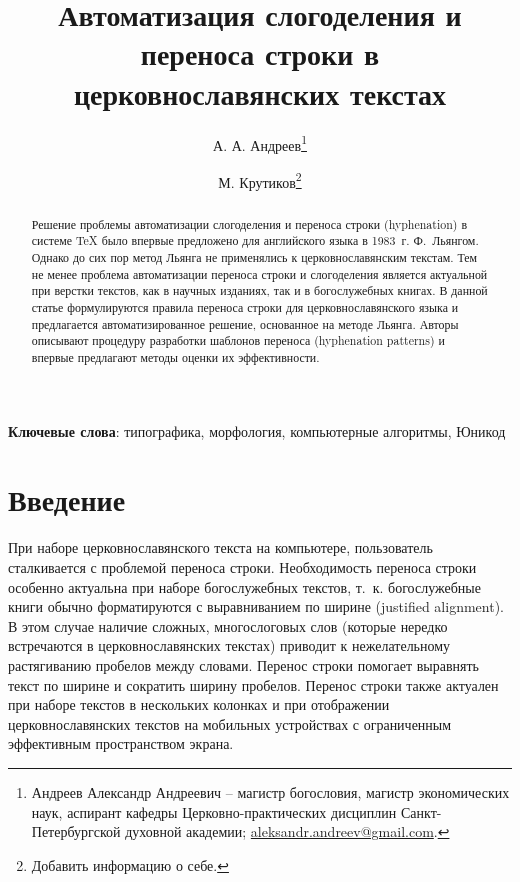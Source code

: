 \documentclass[12pt,a4paper,oneside]{extarticle}
\title{Автоматизация слогоделения и переноса строки в церковнославянских текстах}
\author{А. А. Андреев\thanks{Андреев Александр Андреевич -- магистр богословия, магистр экономических наук, аспирант кафедры Церковно-практических дисциплин Санкт-Петербургской духовной академии; \url{aleksandr.andreev@gmail.com}.} \and М. Крутиков\thanks{Добавить информацию о себе.}}
\date{\vspace{-1em}}  %
\providecommand{\keywords}[1]{\textbf{Ключевые слова}: #1}
\begin{document}
\maketitle

\begin{abstract}
Решение проблемы автоматизации слогоделения и переноса строки
(\textenglish{hyphenation}) в системе \TeX{} было впервые предложено для английского языка в 1983~г.
Ф.~Льянгом. Однако до сих пор метод Льянга не применялись к
церковнославянским текстам. Тем не менее проблема
автоматизации переноса строки и слогоделения является актуальной при
верстки текстов, как в научных изданиях, так и в богослужебных книгах. В данной статье
формулируются правила переноса строки для церковнославянского языка и
предлагается автоматизированное решение, основанное на методе Льянга.
Авторы описывают процедуру разработки шаблонов переноса (\textenglish{hyphenation patterns})
и впервые предлагают методы оценки их эффективности.
\end{abstract}

\keywords{типографика, морфология, компьютерные алгоритмы, Юникод}

\section{Введение}

При наборе церковнославянского текста на компьютере, пользователь сталкивается с проблемой переноса строки. Необходимость переноса строки особенно актуальна при наборе богослужебных текстов, т.~к. богослужебные книги обычно форматируются с выравниванием по ширине (\textenglish{justified alignment}). В этом случае наличие сложных, многослоговых слов (которые нередко встречаются в церковнославянских текстах) приводит к нежелательному растягиванию пробелов между словами. Перенос строки помогает выравнять текст по ширине и сократить ширину пробелов. Перенос строки также актуален при наборе текстов в нескольких колонках и при отображении церковнославянских текстов на мобильных устройствах с ограниченным эффективным пространством экрана.
\end{document}
